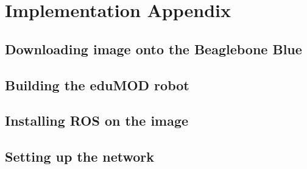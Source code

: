 \chapter{Implementation Appendix}
\label{ch:Implement-Appendix}


\section{Downloading image onto the Beaglebone Blue}

\section{Building the eduMOD robot}

\section{Installing ROS on the image}

\section{Setting up the network}



